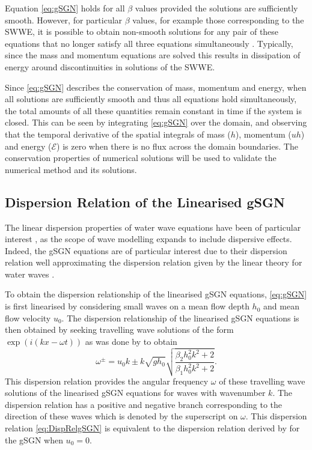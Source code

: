 \documentclass[10pt]{elsarticle}
\begin{document}
Equation \eqref{eq:gSGN} holds for all $\beta$ values provided the solutions are sufficiently smooth. However, for particular $\beta$ values, for example those corresponding to the SWWE, it is possible to obtain non-smooth solutions for any pair of these equations that no longer satisfy all three equations simultaneously \cite{Pu-2018-1361}. Typically, since the mass and momentum equations are solved this results in dissipation of energy around discontinuities in solutions of the SWWE. 

Since \eqref{eq:gSGN} describes the conservation of mass, momentum and energy, when all solutions are sufficiently smooth and thus all equations hold simultaneously, the total amounts of all these quantities remain constant in time if the system is closed. This can be seen by integrating \eqref{eq:gSGN} over the domain, and observing that the temporal derivative of the spatial integrals of mass ($h$), momentum ($uh$) and energy ($\mathcal{E}$) is zero when there is no flux across the domain boundaries. The conservation properties of numerical solutions will be used to validate the numerical method and its solutions. 

\subsection{Dispersion Relation of the Linearised gSGN}
The linear dispersion properties of water wave equations have been of particular interest \cite{Clamond-et.al-2017-245,Filippini-etal-2016-381,DoCarmo-2019-125}, as the scope of wave modelling expands to include dispersive effects. Indeed, the gSGN equations are of particular interest due to their dispersion relation well approximating the dispersion relation given by the linear theory for water waves \cite{Whitham-1967-399}. 

To obtain the dispersion relationship of the linearised gSGN equations, \eqref{eq:gSGN} is first linearised by considering small waves on a mean flow depth $h_0$ and mean flow velocity $u_0$. The dispersion relationship of the linearised gSGN equations is then obtained by seeking travelling wave solutions of the form $\exp\left(i (k x - \omega t)\right)$ as was done by \citet{Zoppou-etal-2017} to obtain
\begin{equation}
\omega^\pm = u_0 k \pm k \sqrt{gh_0} \sqrt{\dfrac{\beta_2 h_0^2 k^2 + 2}{\beta_1 h_0^2 k^2 + 2} }.
\label{eq:DispRelgSGN}
\end{equation}
This dispersion relation provides the angular frequency $\omega$ of these travelling wave solutions of the linearised gSGN equations for waves with wavenumber $k$. The dispersion relation has a positive and negative branch corresponding to the direction of these waves which is denoted by the superscript on $\omega$. This dispersion relation \eqref{eq:DispRelgSGN} is equivalent to the dispersion relation derived by \citet{Clamond-Dutykh-2018-237} for the gSGN when $u_0 = 0$. 
\end{document}
